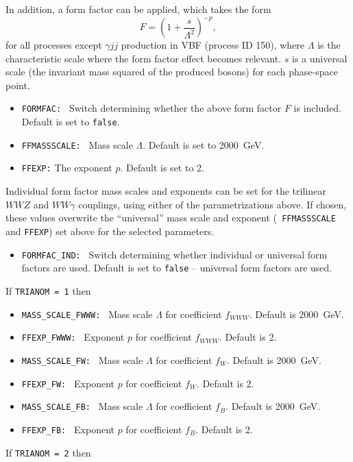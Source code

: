 \documentclass[english,12pt]{article}
\begin{document}
In addition, a form factor can be applied, which takes the form
\begin{equation}
 F = \left(1 + \frac{s}{\Lambda^{2}} \right)^{-p},
\end{equation}
for all processes except $\gamma jj$ production in VBF (process ID 150),
where $\Lambda$ is the characteristic scale where the form factor effect becomes relevant.  $s$ is a universal scale (the
invariant mass squared of the produced bosons) for each phase-space point.
\begin{itemize}
 \item {\tt FORMFAC: }  Switch determining whether the above form factor $F$ is
included.  Default is set to {\tt false}.
 \item {\tt FFMASSSCALE: } Mass scale $\Lambda$.  Default is set to 2000~GeV.
 \item {\tt FFEXP:} The exponent $p$.  Default is set to 2.
\end{itemize}
Individual form factor mass scales and exponents can be set for the trilinear
$WWZ$ and $WW\gamma$ couplings, using either of the parametrizations above.  If
chosen, these values overwrite the ``universal'' mass scale and exponent ({\tt
FFMASSSCALE} and {\tt FFEXP}) set above for the selected parameters.
\begin{itemize}
 \item {\tt FORMFAC\_IND: } Switch determining whether individual or universal
form factors are used.  Default is set to {\tt false} -- universal form factors are used.
\end{itemize}
If {\tt TRIANOM = 1} then
\begin{itemize}
 \item {\tt MASS\_SCALE\_FWWW: } Mass scale $\Lambda$ for coefficient $f_{WWW}$.
 Default is 2000~GeV.
 \item {\tt FFEXP\_FWWW: } Exponent $p$ for coefficient $f_{WWW}$.  Default is 2.
 \item {\tt MASS\_SCALE\_FW: } Mass scale $\Lambda$ for coefficient $f_{W}$. 
Default is 2000~GeV.
 \item {\tt FFEXP\_FW: } Exponent $p$ for coefficient $f_{W}$.  Default is 2.
 \item {\tt MASS\_SCALE\_FB: } Mass scale $\Lambda$ for coefficient $f_{B}$. 
Default is 2000~GeV.
 \item {\tt FFEXP\_FB: } Exponent $p$ for coefficient $f_{B}$.  Default is 2.
\end{itemize}
If {\tt TRIANOM = 2} then
\end{document}
